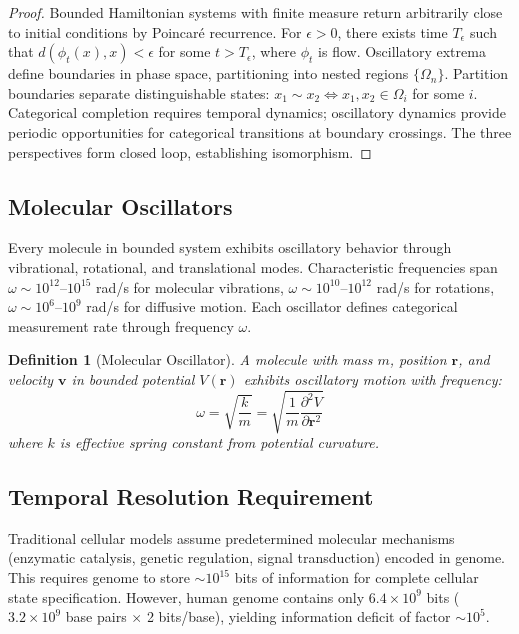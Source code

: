 \documentclass[11pt,a4paper]{article}
\newtheorem{definition}[theorem]{Definition}
\theoremstyle{remark}
\begin{document}
\begin{proof}
Bounded Hamiltonian systems with finite measure return arbitrarily close to initial conditions by Poincaré recurrence. For $\epsilon > 0$, there exists time $T_\epsilon$ such that $d(\phi_t(x), x) < \epsilon$ for some $t > T_\epsilon$, where $\phi_t$ is flow. Oscillatory extrema define boundaries in phase space, partitioning into nested regions $\{\Omega_n\}$. Partition boundaries separate distinguishable states: $x_1 \sim x_2 \iff x_1, x_2 \in \Omega_i$ for some $i$. Categorical completion requires temporal dynamics; oscillatory dynamics provide periodic opportunities for categorical transitions at boundary crossings. The three perspectives form closed loop, establishing isomorphism.
\end{proof}

\subsection{Molecular Oscillators}

Every molecule in bounded system exhibits oscillatory behavior through vibrational, rotational, and translational modes. Characteristic frequencies span $\omega \sim 10^{12}$--$10^{15}$ rad/s for molecular vibrations, $\omega \sim 10^{10}$--$10^{12}$ rad/s for rotations, $\omega \sim 10^6$--$10^9$ rad/s for diffusive motion. Each oscillator defines categorical measurement rate through frequency $\omega$.

\begin{definition}[Molecular Oscillator]
\label{def:molecular_oscillator}
A molecule with mass $m$, position $\mathbf{r}$, and velocity $\mathbf{v}$ in bounded potential $V(\mathbf{r})$ exhibits oscillatory motion with frequency:
\begin{equation}
\omega = \sqrt{\frac{k}{m}} = \sqrt{\frac{1}{m}\frac{\partial^2 V}{\partial \mathbf{r}^2}}
\end{equation}
where $k$ is effective spring constant from potential curvature.
\end{definition}

\subsection{Temporal Resolution Requirement}

Traditional cellular models assume predetermined molecular mechanisms (enzymatic catalysis, genetic regulation, signal transduction) encoded in genome. This requires genome to store $\sim 10^{15}$ bits of information for complete cellular state specification. However, human genome contains only $6.4 \times 10^9$ bits ($3.2 \times 10^9$ base pairs $\times$ 2 bits/base), yielding information deficit of factor $\sim 10^5$.
\end{document}
